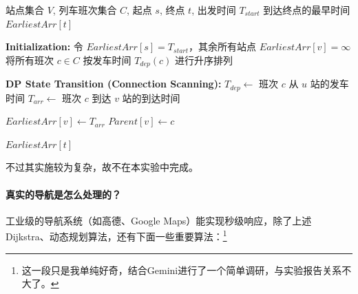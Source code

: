 	\begin{algorithm}[H]
		\caption{基于列车时刻表的动态规划最短路径算法}
		\begin{algorithmic}[1]
			\Require 站点集合 $V$, 列车班次集合 $C$, 起点 $s$, 终点 $t$, 出发时间 $T_{start}$
			\Ensure 到达终点的最早时间 $EarliestArr[t]$
			
			\State \textbf{Initialization:} 
			\State 令 $EarliestArr[s] = T_{start}$，其余所有站点 $EarliestArr[v] = \infty$
			\State 将所有班次 $c \in C$ 按发车时间 $T_{dep}(c)$ 进行升序排列
			
			\State \textbf{DP State Transition (Connection Scanning):}
			\State $T_{dep} \gets$ 班次 $c$ 从 $u$ 站的发车时间
			\State $T_{arr} \gets$ 班次 $c$ 到达 $v$ 站的到达时间
			
			 
			\State $EarliestArr[v] \gets T_{arr}$ 
			\State $Parent[v] \gets c$ 
			\EndIf
			\EndIf
			\EndFor
			
			\State \Return $EarliestArr[t]$
		\end{algorithmic}
	\end{algorithm}
	
	不过其实施较为复杂，故不在本实验中完成。
	
	\paragraph{真实的导航是怎么处理的？}
	
	工业级的导航系统（如高德、Google Maps）能实现秒级响应，除了上述Dijkstra、动态规划算法，还有下面一些重要算法：\footnote{这一段只是我单纯好奇，结合Gemini进行了一个简单调研，与实验报告关系不大了。}
	
